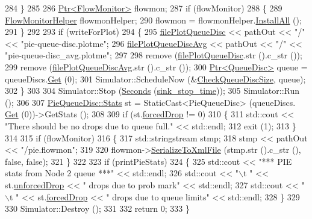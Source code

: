 \begin{DoxyCode}
284     \}
285 
286   \hyperlink{classns3_1_1Ptr}{Ptr<FlowMonitor>} flowmon;
287   \textcolor{keywordflow}{if} (flowMonitor)
288     \{
289       \hyperlink{classns3_1_1FlowMonitorHelper}{FlowMonitorHelper} flowmonHelper;
290       flowmon = flowmonHelper.\hyperlink{classns3_1_1FlowMonitorHelper_a722b383a10c5a959576f3bfee8d4374f}{InstallAll} ();
291     \}
292 
293   \textcolor{keywordflow}{if} (writeForPlot)
294     \{
295       \hyperlink{pie-example_8cc_a06d9ff5c07ecb984ef94ad415abd87b5}{filePlotQueueDisc} << pathOut << \textcolor{stringliteral}{"/"} << \textcolor{stringliteral}{"pie-queue-disc.plotme"};
296       \hyperlink{pie-example_8cc_a4164ee3b210acca3b1e1c45ad2bac980}{filePlotQueueDiscAvg} << pathOut << \textcolor{stringliteral}{"/"} << \textcolor{stringliteral}{"pie-queue-disc\_avg.plotme"};
297 
298       \textcolor{keyword}{remove} (\hyperlink{pie-example_8cc_a06d9ff5c07ecb984ef94ad415abd87b5}{filePlotQueueDisc}.str ().c\_str ());
299       \textcolor{keyword}{remove} (\hyperlink{pie-example_8cc_a4164ee3b210acca3b1e1c45ad2bac980}{filePlotQueueDiscAvg}.str ().c\_str ());
300       \hyperlink{classns3_1_1Ptr}{Ptr<QueueDisc>} queue = queueDiscs.\hyperlink{classns3_1_1QueueDiscContainer_a236064f6321b5f0d32561bb2a14e74af}{Get} (0);
301       Simulator::ScheduleNow (&\hyperlink{pie-example_8cc_a64451d920062e967d2c0fa8b6ae85911}{CheckQueueDiscSize}, queue);
302     \}
303 
304   Simulator::Stop (\hyperlink{group__timecivil_ga33c34b816f8ff6628e33d5c8e9713b9e}{Seconds} (\hyperlink{pie-example_8cc_a2462eef540f5b896f14d4ea7b7bb6214}{sink\_stop\_time}));
305   Simulator::Run ();
306 
307   \hyperlink{structns3_1_1PieQueueDisc_1_1Stats}{PieQueueDisc::Stats} st = StaticCast<PieQueueDisc> (queueDiscs.
      \hyperlink{classns3_1_1QueueDiscContainer_a236064f6321b5f0d32561bb2a14e74af}{Get} (0))->GetStats ();
308 
309   \textcolor{keywordflow}{if} (st.\hyperlink{structns3_1_1PieQueueDisc_1_1Stats_a40eea66d9bc2ce766df9390776eb88a9}{forcedDrop} != 0)
310     \{
311       std::cout << \textcolor{stringliteral}{"There should be no drops due to queue full."} << std::endl;
312       exit (1);
313     \}
314 
315   \textcolor{keywordflow}{if} (flowMonitor)
316     \{
317       std::stringstream stmp;
318       stmp << pathOut << \textcolor{stringliteral}{"/pie.flowmon"};
319 
320       flowmon->\hyperlink{classns3_1_1FlowMonitor_a4c92ccb32c95122857aefbcfc82d6746}{SerializeToXmlFile} (stmp.str ().c\_str (), \textcolor{keyword}{false}, \textcolor{keyword}{false});
321     \}
322 
323   \textcolor{keywordflow}{if} (printPieStats)
324     \{
325       std::cout << \textcolor{stringliteral}{"*** PIE stats from Node 2 queue ***"} << std::endl;
326       std::cout << \textcolor{stringliteral}{"\(\backslash\)t "} << st.\hyperlink{structns3_1_1PieQueueDisc_1_1Stats_afe4c9f6e4c910cf47d475ff5d29d5bb0}{unforcedDrop} << \textcolor{stringliteral}{" drops due to prob mark"} << std::endl;
327       std::cout << \textcolor{stringliteral}{"\(\backslash\)t "} << st.\hyperlink{structns3_1_1PieQueueDisc_1_1Stats_a40eea66d9bc2ce766df9390776eb88a9}{forcedDrop} << \textcolor{stringliteral}{" drops due to queue limits"} << std::endl;
328     \}
329 
330   Simulator::Destroy ();
331 
332   \textcolor{keywordflow}{return} 0;
333 \}
\end{DoxyCode}


